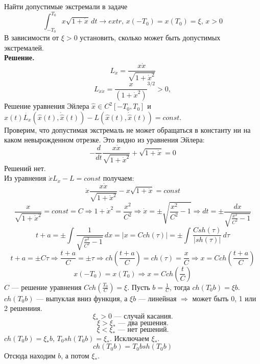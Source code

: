 \begin{task} \label{task6}
    Найти допустимые экстремали в задаче
    \[  \int_{-T_{0}}^{T_{0}} x\sqrt{1 + \dot{x}} \,dt \rightarrow extr\text{, }x(-T_{0}) = x(T_{0}) = \xi\text{, } x > 0 \]
    В зависимости от $\xi > 0$ установить, сколько может быть допустимых экстремалей. \\
    \textbf{Решение.} \\
    \[L_{\dot{x}} = \frac{x\dot{x}}{\sqrt{1 + \dot{x}^2}}\]
    \[L_{\dot{x}\dot{x}} = {\frac{x}{(1 + \dot{x}^{2})}^ {3/2}} > 0,\]
    Решение уравнения Эйлера $\hat{x} \in C^2[-T_{0}, T_{0}]$ и $\hat{x}(t)\dot{L_{x}}(\hat{x}(t),
        \dot{\hat{x}}(t)) - L(\hat{x}(t),
        \dot{\hat{x}}(t)) = const$.\\
    Проверим, что допустимая экстремаль не может обращаться в константу ни на каком невырожденном отрезке. Это видно из уравнения Эйлера:
    \[-\frac{d}{dt} \frac{x\dot{x}}{\sqrt{1 + \dot{x}^2}} + \sqrt{1 + \dot{x}} = 0\]
    Решений нет. \\
    Из уравнения $\dot{x}L_{\dot{x}} - L = const$ получаем: \\
    \[ \dot{x} \frac{x\dot{x}}{\sqrt{1 + \dot{x}^2}} - x\sqrt{1 + \dot{x}} = const\]
    \[\frac{x}{\sqrt{1 + \dot{x}^2}} = const = C \Rightarrow 1 + \dot{x}^2 = \frac{x^2}{C^2} \Rightarrow \dot{x} = \pm \sqrt{\frac{x^2}{C^2} - 1} \Rightarrow dt = \pm \frac{dx}{\sqrt{\frac{x^2}{C^2} - 1}}\]
    \[t + a = \pm \int_{}^{}\frac{1}{\sqrt{\frac{x^2}{C^2} - 1}} \,dx = \left| x = Cch(\tau) \right| = \pm \int_{}^{}\frac{C sh(\tau)}{|sh(\tau)|} \,d\tau \]
    \[t + a = \pm C\tau \Rightarrow \frac{t+a}{C} = \pm \tau \Rightarrow ch\left(\frac{t+a}{C}\right) = ch(\tau) = \frac{x}{C} \Rightarrow x = Cch\left(\frac{t+a}{C}\right)\]
    \[x(-T_{0}) = x(T_{0}) \Rightarrow x = Cch\left(\frac{t}{C}\right)\]
    $C$ --- решение уравнения $Cch\left(\frac{T_{0}}{C}\right) = \xi$. Пусть $b = \frac{1}{C}$, тогда $ch(T_{0}b) = \xi b$. $ch(T_{0}b)$ --- выпуклая вниз функция, а $\xi b$ --- линейная $\Rightarrow$ может быть 0, 1 или 2 решениия.
    \[\xi_{*} > 0 \text{ --- случай касания.}\]
    \[\xi > \xi_{*} \text{ --- два решения.}\]
    \[\xi < \xi_{*} \text{ --- нет решений.}\]
    $ch(T_{0}b) = \xi_{*}b$, $T_{0}sh(T_{0}b) = \xi_{*}$. Исключаем $\xi_{*}$.
    \[ch(T_{0}b) = T_{0}bsh(T_{0}b)\]
    Отсюда находим $b$, а потом $\xi_{*}$.
\end{task}